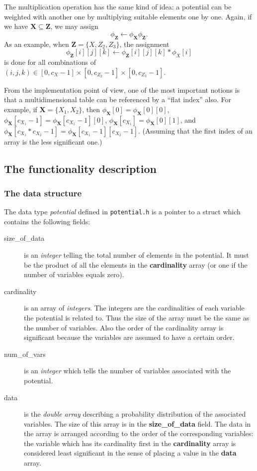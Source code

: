 \documentclass[12pt,a4paper]{report}
\newcommand{\cdatatype}[1]{{\it #1}}
\newcommand{\cfilename}[1]{\texttt{#1}}
\newcommand{\cstructfield}[1]{\textbf{#1}}
\begin{document}
The multiplication operation has the same kind of idea: a potential can
be weighted with another one by multiplying suitable elements one by one.
Again, if we have $\mathbf{X} \subseteq \mathbf{Z}$, we may assign
\begin{equation}
\phi_\mathbf{Z} \leftarrow \phi_\mathbf{X} \phi_\mathbf{Z}.
\end{equation}
As an example, when $\mathbf{Z} = \{X, Z_2, Z_3\}$, the assignment
\begin{equation}
\phi_\mathbf{Z}[i][j][k] \leftarrow \phi_\mathbf{Z}[i][j][k]*\phi_X[i]
\end{equation}
is done for all combinations of 
$(i,j,k) \in [0,c_X-1]\times[0,c_{Z_2}-1]\times[0,c_{Z_3}-1]$.

From the implementation point of view, one of the most important
notions is that a multidimensional table can be referenced by a 
``flat index'' also. For example, if $\mathbf{X} = \{X_1,X_2\}$, then 
$\phi_\mathbf{X}[0] = \phi_\mathbf{X}[0][0]$, 
$\phi_\mathbf{X}[c_{X_1}-1] = \phi_\mathbf{X}[c_{X_1}-1][0]$,
$\phi_\mathbf{X}[c_{X_1}] = \phi_\mathbf{X}[0][1]$, and 
$\phi_\mathbf{X}[c_{X_1}*c_{X_2}-1] = \phi_\mathbf{X}[c_{X_1}-1][c_{X_2}-1]$. 
(Assuming that the first index of an array is the less significant one.)


\subsection{The functionality description}
\subsubsection{The data structure}
The data type \cdatatype{potential} defined in \cfilename{potential.h} 
is a pointer to a struct which contains the following fields:
\begin{description}
\item[size\_of\_data] is an \cdatatype{integer} telling the total
number of elements in the potential. It must be the product of all the
elements in the \cstructfield{cardinality} array (or one if the number
of variables equals zero).
\item[cardinality] is an array of \cdatatype{integers}. The integers
are the cardinalities of each variable the potential is related
to. Thus the size of the array must be the same as the number of
variables. Also the order of the cardinality array is significant
because the variables are assumed to have a certain order.
\item[num\_of\_vars] is an \cdatatype{integer} which tells the number
of variables associated with the potential.
\item[data] is the \cdatatype{double array} describing a probability
distribution of the associated variables. The size of this array is in
the \cstructfield{size\_of\_data} field. The data in the array is
arranged according to the order of the corresponding variables: the
variable which has its cardinality first in the
\cstructfield{cardinality} array is considered least significant in
the sense of placing a value in the \cstructfield{data} array.
\end{description}
\end{document}
